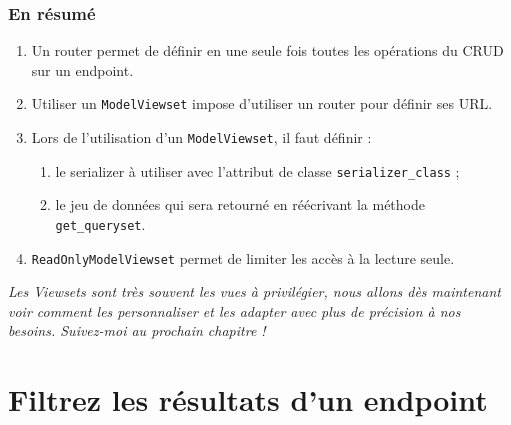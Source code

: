 \documentclass[a4paper]{article}
\begin{document}
\subsubsection*{En résumé}
\begin{enumerate}
\item Un router permet de définir en une seule fois toutes les opérations du CRUD sur un endpoint.
\item Utiliser un  {\tt ModelViewset}  impose d’utiliser un router pour définir ses URL.
\item Lors de l’utilisation d’un {\tt ModelViewset}, il faut définir :
\begin{enumerate}
\item le serializer à utiliser avec l’attribut de classe {\tt serializer\_class}  ;
\item le jeu de données qui sera retourné en réécrivant la méthode {\tt get\_queryset}.
\end{enumerate}
\item {\tt ReadOnlyModelViewset}  permet de limiter les accès à la lecture seule.
\end{enumerate}
{\em Les Viewsets sont très souvent les vues à privilégier, nous allons dès maintenant voir comment les personnaliser et les adapter avec plus de précision à nos besoins. Suivez-moi au prochain chapitre !}

\section{Filtrez les résultats d’un endpoint}
\end{document}
